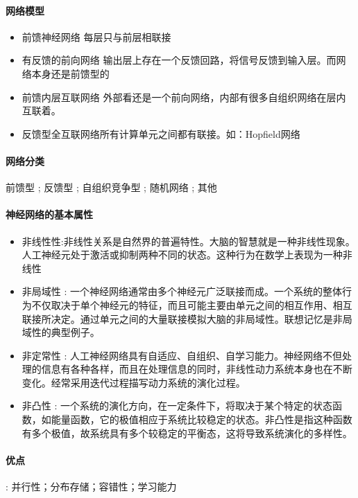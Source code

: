 \documentclass[UTF8,a4paper]{ctexart}
\begin{document}
\paragraph{网络模型}
\begin{itemize}
	\item {前馈神经网络} 每层只与前层相联接

	\item{有反馈的前向网络} 输出层上存在一个反馈回路，将信号反馈到输入层。而网络本身还是前馈型的

	\item{前馈内层互联网络} 外部看还是一个前向网络，内部有很多自组织网络在层内互联着。

	\item{反馈型全互联网络}所有计算单元之间都有联接。如：Hopfield网络

\end{itemize}

\paragraph{网络分类}前馈型  ; 反馈型 ; 自组织竞争型 ; 随机网络 ; 其他

\paragraph{神经网络的基本属性}
\begin{itemize}
	\item 非线性性:非线性关系是自然界的普遍特性。大脑的智慧就是一种非线性现象。人工神经元处于激活或抑制两种不同的状态。这种行为在数学上表现为一种非线性
	\item 非局域性 : 一个神经网络通常由多个神经元广泛联接而成。一个系统的整体行为不仅取决于单个神经元的特征，而且可能主要由单元之间的相互作用、相互联接所决定。通过单元之间的大量联接模拟大脑的非局域性。联想记忆是非局域性的典型例子。
	\item 非定常性 : 人工神经网络具有自适应、自组织、自学习能力。神经网络不但处理的信息有各种各样，而且在处理信息的同时，非线性动力系统本身也在不断变化。经常采用迭代过程描写动力系统的演化过程。
	\item 非凸性 : 一个系统的演化方向，在一定条件下，将取决于某个特定的状态函数，如能量函数，它的极值相应于系统比较稳定的状态。非凸性是指这种函数有多个极值，故系统具有多个较稳定的平衡态，这将导致系统演化的多样性。
\end{itemize}

\paragraph{优点} : 并行性；分布存储；容错性；学习能力
\end{document}
